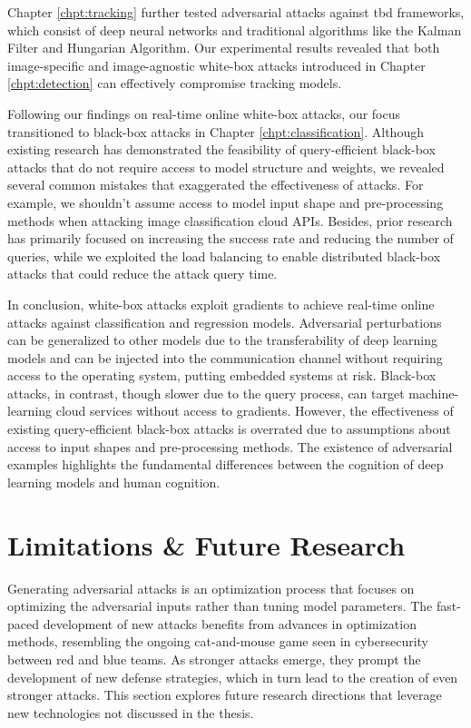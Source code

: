 Chapter \ref{chpt:tracking} further tested adversarial attacks against \acrfull{tbd} frameworks, which consist of deep neural networks and traditional algorithms like the Kalman Filter and Hungarian Algorithm. Our experimental results revealed that both image-specific and image-agnostic white-box attacks introduced in Chapter \ref{chpt:detection} can effectively compromise tracking models.

Following our findings on real-time online white-box attacks, our focus transitioned to black-box attacks in Chapter \ref{chpt:classification}. Although existing research has demonstrated the feasibility of query-efficient black-box attacks that do not require access to model structure and weights, we revealed several common mistakes that exaggerated the effectiveness of attacks. For example, we shouldn't assume access to model input shape and pre-processing methods when attacking image classification cloud APIs. Besides,  prior research has primarily focused on increasing the success rate and reducing the number of queries, while we exploited the load balancing to enable distributed black-box attacks that could reduce the attack query time.

In conclusion, white-box attacks exploit gradients to achieve real-time online attacks against classification and regression models. Adversarial perturbations can be generalized to other models due to the transferability of deep learning models and can be injected into the communication channel without requiring access to the operating system, putting embedded systems at risk. Black-box attacks, in contrast, though slower due to the query process, can target machine-learning cloud services without access to gradients. However, the effectiveness of existing query-efficient black-box attacks is overrated due to assumptions about access to input shapes and pre-processing methods. The existence of adversarial examples highlights the fundamental differences between the cognition of deep learning models and human cognition.
\section{Limitations \& Future Research}

Generating adversarial attacks is an optimization process that focuses on optimizing the adversarial inputs rather than tuning model parameters. The fast-paced development of new attacks benefits from advances in optimization methods, resembling the ongoing cat-and-mouse game seen in cybersecurity between red and blue teams. As stronger attacks emerge, they prompt the development of new defense strategies, which in turn lead to the creation of even stronger attacks. This section explores future research directions that leverage new technologies not discussed in the thesis.

